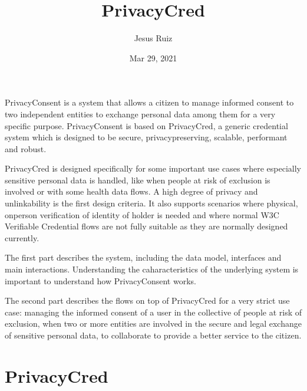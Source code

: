 \documentclass[a4paper,12pt,english,openany]{sphinxmanual}
\title{PrivacyCred}
\date{Mar 29, 2021}
\author{Jesus Ruiz}
\begin{document}
\pagestyle{empty}
\sphinxmaketitle
\pagestyle{plain}
\sphinxtableofcontents
\pagestyle{normal}
\label{\detokenize{index::doc}}


\sphinxAtStartPar
PrivacyConsent is a system that allows a citizen to manage informed consent to two independent
entities to exchange personal data among them for a very specific purpose. PrivacyConsent is based
on PrivacyCred, a generic credential system which is designed to be secure, privacy\sphinxhyphen{}preserving,
scalable, performant and robust.

\sphinxAtStartPar
PrivacyCred is designed specifically for some important use cases where especially sensitive
personal data is handled, like when people at risk of exclusion is involved or with some health data
flows. A high degree of privacy and unlinkability is the first design criteria. It also supports
scenarios where physical, on\sphinxhyphen{}person verification of identity of holder is needed and where normal
W3C Verifiable Credential flows are not fully suitable as they are normally designed currently.

\sphinxAtStartPar
{}

\sphinxAtStartPar
The first part describes the {\hyperref[\detokenize{privacycred::doc}]{}} system, including the data model, interfaces and main
interactions. Understanding the caharacteristics of the underlying system is important to understand how PrivacyConsent works.

\sphinxAtStartPar
{}

\sphinxAtStartPar
The second part describes the {\hyperref[\detokenize{privacyconsent::doc}]{}} flows on top of PrivacyCred for a very strict use case:
managing the informed consent of a user in the collective of people at risk of exclusion, when two or more entities are involved in the secure and legal exchange of sensitive personal data, to collaborate to provide a better service to the citizen.


\chapter{PrivacyCred}
\label{\detokenize{privacycred:privacycred}}\label{\detokenize{privacycred::doc}}
\end{document}
